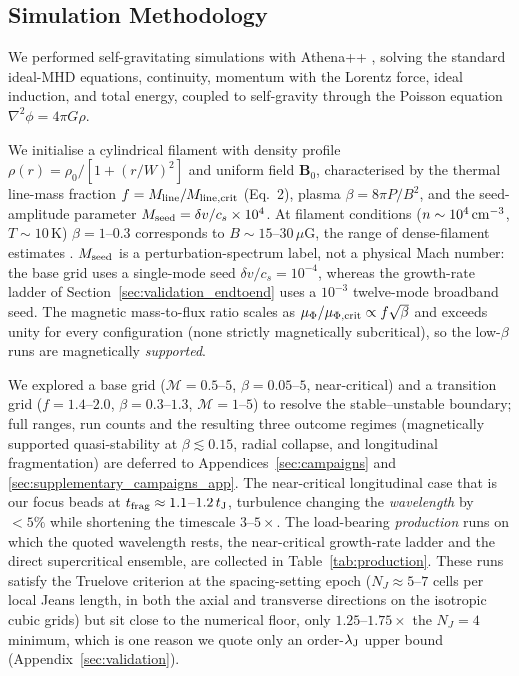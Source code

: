 \documentclass[usenatbib,twoside,twocolumn]{mnras}
\begin{document}
\subsection{Simulation Methodology}

We performed self-gravitating simulations with Athena++ \citep{Stone2020}, solving the standard ideal-MHD equations, continuity, momentum with the Lorentz force, ideal induction, and total energy, coupled to self-gravity through the Poisson equation $\nabla^2\phi=4\pi G\rho$.

We initialise a cylindrical filament with density profile $\rho(r)=\rho_0/[1+(r/W)^2]$ and uniform field $\mathbf{B}_0$, characterised by the thermal line-mass fraction $f=M_{\rm line}/M_{\rm line,crit}$ (Eq.~2), plasma $\beta=8\pi P/B^2$, and the seed-amplitude parameter $M_{\rm seed}=\delta v/c_s\times10^{4}$. At filament conditions ($n\sim10^4\,{\rm cm^{-3}}$, $T\sim10$\,K) $\beta=1$--$0.3$ corresponds to $B\sim15$--$30\,\mu$G, the range of dense-filament estimates \citep{Crutcher2012}. $M_{\rm seed}$ is a perturbation-spectrum label, not a physical Mach number: the base grid uses a single-mode seed $\delta v/c_s=10^{-4}$, whereas the growth-rate ladder of Section~\ref{sec:validation_endtoend} uses a $10^{-3}$ twelve-mode broadband seed. The magnetic mass-to-flux ratio scales as $\mu_\Phi/\mu_{\Phi,\rm crit}\propto f\sqrt{\beta}$ and exceeds unity for every configuration (none strictly magnetically subcritical), so the low-$\beta$ runs are magnetically \emph{supported}.

We explored a base grid ($\mathcal{M}=0.5$--$5$, $\beta=0.05$--$5$, near-critical) and a transition grid ($f=1.4$--$2.0$, $\beta=0.3$--$1.3$, $\mathcal{M}=1$--$5$) to resolve the stable--unstable boundary; full ranges, run counts and the resulting three outcome regimes (magnetically supported quasi-stability at $\beta\lesssim0.15$, radial collapse, and longitudinal fragmentation) are deferred to Appendices~\ref{sec:campaigns} and \ref{sec:supplementary_campaigns_app}. The near-critical longitudinal case that is our focus beads at $t_{\rm frag}\approx1.1$--$1.2\,t_{\rm J}$, turbulence changing the \emph{wavelength} by $<5\%$ while shortening the timescale $3$--$5\times$. The load-bearing \emph{production} runs on which the quoted wavelength rests, the near-critical growth-rate ladder and the direct supercritical ensemble, are collected in Table~\ref{tab:production}. These runs satisfy the Truelove criterion at the spacing-setting epoch ($N_J\approx5$--$7$ cells per local Jeans length, in both the axial and transverse directions on the isotropic cubic grids) but sit close to the numerical floor, only $1.25$--$1.75\times$ the $N_J=4$ minimum, which is one reason we quote only an order-$\lambda_{\rm J}$ upper bound (Appendix~\ref{sec:validation}).
\end{document}
